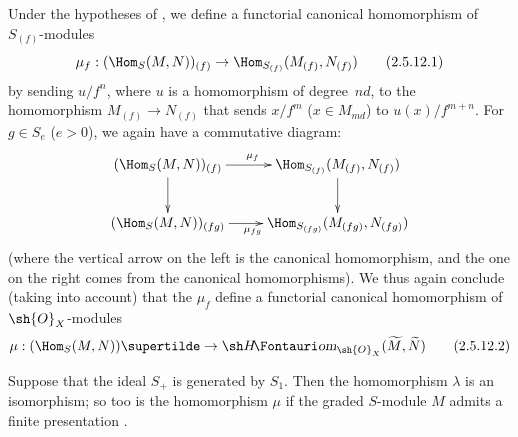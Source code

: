 \begin{env}[2.5.12]
\label{II.2.5.12}
Under the hypotheses of , we define a functorial canonical homomorphism of $S_{(f)}$-modules
\[
\label{II.2.5.12.1}
  \mu_f: (\Hom_S(M,N))_{(f)} \to \Hom_{S_{(f)}}(M_{(f)},N_{(f)})
\tag{2.5.12.1}
\]
by sending $u/f^n$, where $u$ is a homomorphism of degree~$nd$, to the homomorphism $M_{(f)}\to N_{(f)}$ that sends $x/f^m$ ($x\in M_{md}$) to $u(x)/f^{m+n}$.
For $g\in S_e$ ($e>0$), we again have a commutative diagram:
\[
  \xymatrix{
    (\Hom_S(M,N))_{(f)} \ar[r]^{\mu_f} \ar[d]
    & \Hom_{S_{(f)}}(M_{(f)},N_{(f)}) \ar[d]
  \\(\Hom_S(M,N))_{(fg)} \ar[r]_{\mu_{fg}}
    & \Hom_{S_{(fg)}}(M_{(fg)},N_{(fg)})
  }
\]
(where the vertical arrow on the left is the canonical homomorphism, and the one on the right comes from the canonical homomorphisms).
We thus again conclude (taking  into account) that the $\mu_f$ define a functorial canonical homomorphism of $\sh{O}_X$-modules
\[
\label{II.2.5.12.2}
  \mu: (\Hom_S(M,N))\supertilde \to \shHom_{\sh{O}_X}(\widetilde{M},\widetilde{N})
\tag{2.5.12.2}
\]
\end{env}

\begin{proposition}[2.5.13]
\label{II.2.5.13}
Suppose that the ideal $S_+$ is generated by $S_1$.
Then the homomorphism $\lambda$  is an isomorphism;
  so too is the homomorphism $\mu$  if the graded $S$-module $M$ admits a finite presentation .
\end{proposition}

